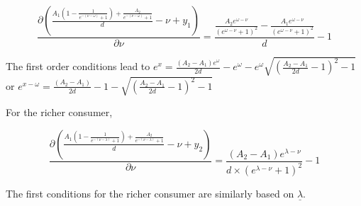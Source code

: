 \documentclass{article}
\begin{document}
\[\frac{\partial \left(\frac{A_1 \left(1-\frac{1}{e^ {-(\nu-\omega )}+1}\right)+\frac{A_2}{e^ {-(\nu-\omega )}+1}}{d}-\nu+y_1\right)}{\partial
\nu}=\frac{\frac{A_2 e^{\omega -\nu}}{\left(e^{\omega -\nu}+1\right)^2}-\frac{A_1 e^{\omega -\nu}}{\left(e^{\omega -\nu}+1\right)^2}}{d}-1\]

The first order conditions lead to
$e^x = \frac{(A_2-A_1) e^{\omega}}{2d}-e^{\omega}-e^\omega \sqrt{(\frac{A_2-A_1}{2d}-1)^2-1}$
or
$e^{x-\omega} = \frac{(A_2-A_1) }{2d}-1- \sqrt{(\frac{A_2-A_1}{2d}-1)^2-1}$

For the richer consumer, 


\[\frac{\partial (\frac{A_1 (1-\frac{1}{e^ {-(\nu-\lambda )}+1})+\frac{A_2}{e^ {-(\nu-\lambda )}+1}}{d}-\nu+y_2)}{\partial
\nu}=\frac{(A_2-A_1) e^{\lambda -\nu}}{d\times(e^{\lambda -\nu}+1)^2}-1\]

The first conditions for the richer consumer are similarly based on $\underline{\lambda}$.

\end{document}
